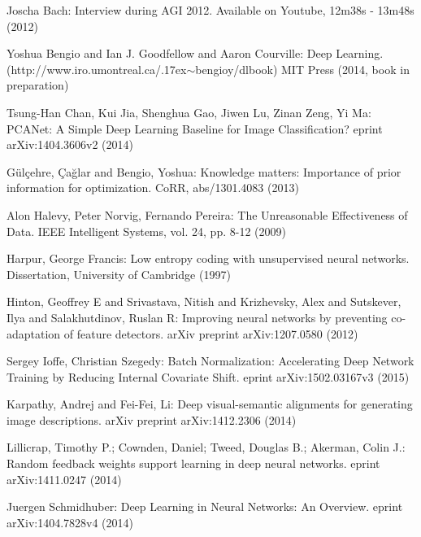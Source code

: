 \documentclass[citeauthoryear]{llncs}
\begin{document}
%
%
\begin{thebibliography}{}
%
\newcommand{\mytilde}{\raise.17ex\hbox{$\scriptstyle\mathtt{\sim}$}}

Joscha Bach:
Interview during AGI 2012.
Available on Youtube, 12m38s - 13m48s (2012)

Yoshua Bengio and Ian J. Goodfellow and Aaron Courville:
Deep Learning.
(http://www.iro.umontreal.ca/\mytilde{}bengioy/dlbook)
MIT Press (2014, book in preparation)

Tsung-Han Chan, Kui Jia, Shenghua Gao, Jiwen Lu, Zinan Zeng, Yi Ma:
PCANet: A Simple Deep Learning Baseline for Image Classification?
eprint arXiv:1404.3606v2 (2014)

G{\"u}l{\c{c}}ehre, {\c{C}}a{\u{g}}lar and Bengio, Yoshua:
Knowledge matters: Importance of prior information for optimization.
CoRR, abs/1301.4083 (2013)

Alon Halevy, Peter Norvig, Fernando Pereira:
The Unreasonable Effectiveness of Data.
IEEE Intelligent Systems, vol. 24, pp. 8-12 (2009)

Harpur, George Francis: 
Low entropy coding with unsupervised neural networks.
Dissertation, University of Cambridge (1997)

Hinton, Geoffrey E and Srivastava, Nitish and Krizhevsky, Alex and Sutskever, Ilya and Salakhutdinov, Ruslan R:
Improving neural networks by preventing co-adaptation of feature detectors.
arXiv preprint arXiv:1207.0580 (2012)

Sergey Ioffe, Christian Szegedy:
Batch Normalization: Accelerating Deep Network Training by Reducing Internal Covariate Shift.
eprint arXiv:1502.03167v3 (2015)

Karpathy, Andrej and Fei-Fei, Li:
Deep visual-semantic alignments for generating image descriptions.
arXiv preprint arXiv:1412.2306 (2014)

Lillicrap, Timothy P.; Cownden, Daniel; Tweed, Douglas B.; Akerman, Colin J.:
Random feedback weights support learning in deep neural networks.
eprint arXiv:1411.0247 (2014)

Juergen Schmidhuber:
Deep Learning in Neural Networks: An Overview.
eprint arXiv:1404.7828v4 (2014)


\end{thebibliography}
\end{document}
